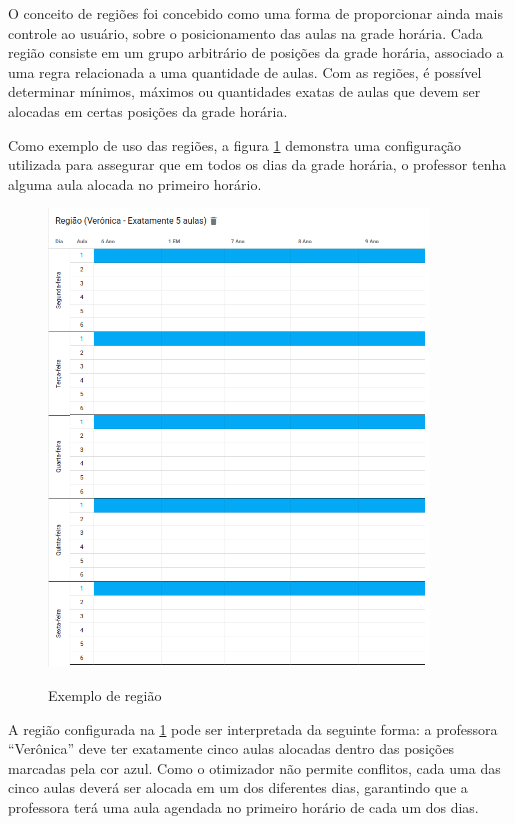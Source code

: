 O conceito de regiões foi concebido como uma forma de proporcionar ainda mais controle ao usuário, sobre o posicionamento das aulas na grade horária. Cada região consiste em um grupo arbitrário de posições da grade horária, associado a uma regra relacionada a uma quantidade de aulas. Com as regiões, é possível determinar mínimos, máximos ou quantidades exatas de aulas que devem ser alocadas em certas posições da grade horária.

Como exemplo de uso das regiões, a figura \ref{fig:regioes} demonstra uma configuração utilizada para assegurar que em todos os dias da grade horária, o professor tenha alguma aula alocada no primeiro horário.

\begin{figure}[!htb]
	\centering
	\caption{Exemplo de região}
	\includegraphics[width=0.9\textwidth]{./dados/figuras/regioes}
	\label{fig:regioes}
\end{figure}

A região configurada na \ref{fig:regioes} pode ser interpretada da seguinte forma: a professora ``Verônica'' deve ter exatamente cinco aulas alocadas dentro das posições marcadas pela cor azul. Como o otimizador não permite conflitos, cada uma das cinco aulas deverá ser alocada em um dos diferentes dias, garantindo que a professora terá uma aula agendada no primeiro horário de cada um dos dias.


